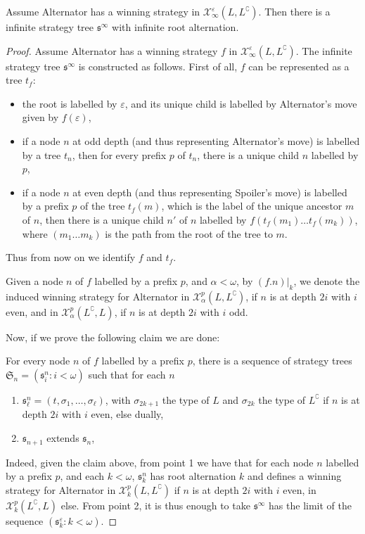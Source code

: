 \begin{proposition}\label{prop:types}
 Assume Alternator has a winning strategy in  $\mathcal{X}^\varepsilon_\infty(L, L^\complement)$. Then there is a infinite strategy tree $\mathfrak{s}^\infty$ with infinite root alternation. 
\end{proposition} 
 \begin{proof}
 Assume Alternator has a winning strategy $f$ in  $\mathcal{X}^\varepsilon_\infty(L, L^\complement)$. The infinite strategy tree $\mathfrak{s}^\infty$ is constructed as follows. First of all, $f$ can be represented as a tree $t_f$: 
\begin{itemize}
\item the root is labelled by $\varepsilon$, and its unique child is labelled by Alternator's move given by $f(\varepsilon)$,
\item if a node $n$ at odd depth (and thus representing Alternator's move) is labelled by a tree $t_n$, then for every prefix $p$ of $t_n$, there is a unique child $n$ labelled by $p$,
\item if a node $n$ at even depth (and thus representing Spoiler's move) is labelled by a prefix $p$ of the tree $t_f(m)$, which is the label of the unique ancestor $m$ of $n$, then there is a unique child $n'$ of $n$ labelled by $f(t_f(m_1)\dots t_f(m_k))$, where $(m_1\dots m_k)$ is the path from the root of the tree to $m$.
\end{itemize}
Thus from now on we identify $f$ and $t_f$.

Given a node $n$ of $f$ labelled by a prefix $p$, and $\alpha < \omega$,  by $(f.n)|_k$, we denote the induced  winning strategy  for Alternator in  $\mathcal{X}^p_\alpha(L, L^\complement)$, if $n$ is at depth $2i$ with $i$ even, and in  $\mathcal{X}^p_\alpha(L^\complement, L)$, if $n$ is at depth $2i$ with $i$ odd.

Now, if we prove the following claim we are done:
\begin{claim}\label{claim:strategy}
For every node $n$ of $f$ labelled by a prefix $p$, 
there is a sequence of strategy trees $\mathfrak{S}_n=(\mathfrak{s}^n_i: i < \omega)$ such that for each $n$
\begin{enumerate}
\item $\mathfrak{s}^n_\ell=(t, \sigma_1, \dots, \sigma_\ell)$, with $\sigma_{2k+1}$ the type of $L$ and $\sigma_{2k}$ the type of  $L^\complement$ if $n$ is at depth $2i$ with $i$ even, else dually,
\item $\mathfrak{s}_{n+1}$ extends $\mathfrak{s}_n$,
\end{enumerate}
\end{claim}
Indeed, given the claim above, from point 1 we have that
for each node $n$ labelled by a prefix $p$, and each $k < \omega$, $\mathfrak{s}^n_k$ has root alternation $k$ and defines a winning strategy for Alternator in $\mathcal{X}^p_k(L, L^\complement)$ if $n$ is at depth $2i$ with $i$ even, in $\mathcal{X}^p_k(L^\complement, L)$ else.
From point 2, it is thus enough to take $\mathfrak{s}^\infty$ has the limit of the sequence $(\mathfrak{s}^\varepsilon_k: k < \omega)$. 


\end{proof}
